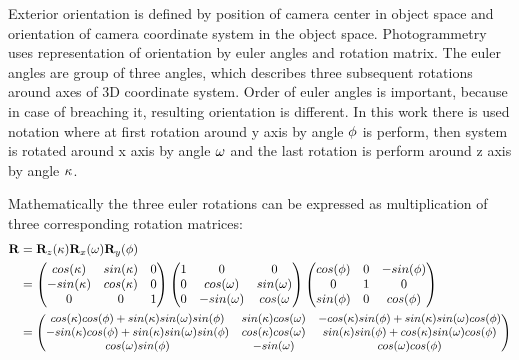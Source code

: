 \documentclass[a4paper,12pt]{article}
\newcommand{\ematr}[1]{
{\bf #1}
}
\newcommand{\escal}[1]{
{\it #1}
}
\begin{document}
Exterior orientation is defined by position of camera center in object space and orientation of camera coordinate system in the object space.
Photogrammetry uses representation of orientation by euler angles and rotation matrix.
The euler angles are group of three angles, which describes three subsequent rotations
 around axes of 3D coordinate system. 
 Order of euler angles is important, because in case of breaching it, resulting orientation is different. 
 In this work there is used notation where at first rotation around y axis by angle $\escal{\phi}$ is 
 perform, then system is rotated around x axis  by angle $\escal{\omega}$ and
 the last rotation is perform around z axis by angle $\escal{\kappa}$.
 
Mathematically the three euler rotations can be expressed as multiplication of three corresponding
rotation matrices:
 \begin{equation}
 \begin{split}
\ematr{R} &= \ematr{R}_{z}(\escal{\kappa}) \ematr{R}_{x}(\escal{\omega}) \ematr{R}_{y}(\escal{\phi}) \\
	  &= \begin{pmatrix}
	      cos(\escal{\kappa}) & sin(\escal{\kappa}) & 0 \\
	      -sin(\escal{\kappa}) & cos(\escal{\kappa}) & 0 \\
	      0 & 0 & 1
	      \end{pmatrix}
	      \begin{pmatrix}
	      1 & 0 & 0 \\
	      0 & cos(\escal{\omega}) & sin(\escal{\omega}) \\
	      0 & -sin(\escal{\omega}) & cos(\escal{\omega} 
	      \end{pmatrix}
	      \begin{pmatrix}
	      cos(\escal{\phi}) & 0 & -sin(\escal{\phi}) \\
	      0 & 1 & 0 \\
	      sin(\phi) & 0 & cos(\phi)      
	      \end{pmatrix} \\
	  &=  
	      \small
	      \begin{pmatrix}
	      cos(\escal{\kappa}) cos(\escal{\phi}) + sin(\escal{\kappa}) sin(\escal{\omega}) sin(\escal{\phi}) & 
	      sin(\escal{\kappa}) cos(\escal{\omega})  & 
	      -cos(\escal{\kappa}) sin(\escal{\phi}) + sin(\escal{\kappa}) sin(\escal{\omega}) cos(\escal{\phi}) 
	      \\
	      -sin(\escal{\kappa}) cos(\escal{\phi}) + sin(\escal{\kappa}) sin(\escal{\omega}) sin(\escal{\phi}) & 
	      cos(\escal{\kappa}) cos(\escal{\omega})  & 
	      sin(\escal{\kappa}) sin(\escal{\phi}) + cos(\escal{\kappa}) sin(\escal{\omega}) cos(\escal{\phi}) 
	      \\	      
	      cos(\escal{\omega}) sin(\escal{\phi}) & 
	      -sin(\escal{\omega})  & 
	      cos(\escal{\omega}) cos(\escal{\phi}) 
	      \\		      
	      \end{pmatrix} 
\end{split}
\end{equation}
\end{document}
